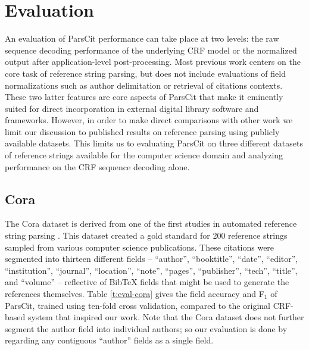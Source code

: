 \documentclass[10pt, a4paper]{article}
\begin{document}
\section{Evaluation}

An evaluation of ParsCit performance can take place at two levels:
the raw sequence decoding performance of the underlying CRF model
or the normalized output after application-level post-processing.
Most previous work centers
on the core task of reference string parsing, but does not
include evaluations of field normalizations such as author delimitation or retrieval of citations
contexts.  These two latter features are core aspects of ParsCit that
make it eminently suited for direct incorporation in external digital
library software and frameworks.  However, in order to make direct
comparisons with other work we limit our discussion to
published results on reference parsing using publicly available
datasets.  This limits us to evaluating ParsCit on three different
datasets of reference strings available for the computer science domain
and analyzing performance on the CRF sequence decoding alone.

\subsection{Cora}

The Cora dataset is derived from one of the first studies in automated
reference string parsing
\cite{seymore99:_learn_hidden_markov_model_struc_infor_extrac}.  This
dataset created a gold standard for 200 reference strings sampled from
various computer science publications.  These citations were segmented
into thirteen different fields -- ``author'', ``booktitle'', ``date'',
``editor'', ``institution'', ``journal'', ``location'', ``note'',
``pages'', ``publisher'', ``tech'', ``title'', and ``volume'' --
reflective of BibTeX fields that might be used to generate the
references themselves.  Table \ref{t:eval-cora} gives the field
accuracy and F$_1$ of ParsCit, trained using ten-fold cross
validation, compared to the original CRF-based system
\cite{peng04accurate} that inspired our work.  Note that the Cora
dataset does not further segment the author field into individual
authors; so our evaluation is done by regarding any contiguous
``author'' fields as a single field.
\end{document}
